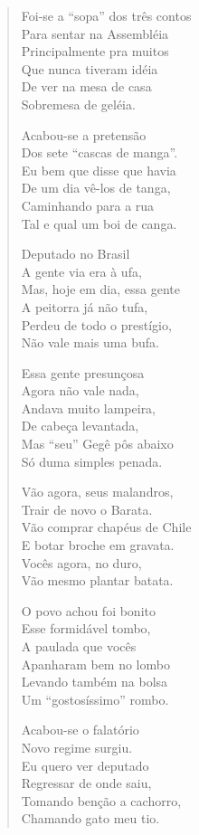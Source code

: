 \begin{verse}
Foi-se a “sopa” dos três contos\\
Para sentar na Assembléia\\
Principalmente pra muitos\\
Que nunca tiveram idéia\\
De ver na mesa de casa\\
Sobremesa de geléia.

Acabou-se a pretensão\\
Dos sete “cascas de manga”.\\
Eu bem que disse que havia\\
De um dia vê-los de tanga,\\
Caminhando para a rua\\
Tal e qual um boi de canga.
\pagebreak

Deputado no Brasil\\
A gente via era à ufa,\\
Mas, hoje em dia, essa gente\\
A peitorra já não tufa,\\
Perdeu de todo o prestígio,\\
Não vale mais uma bufa.

Essa gente presunçosa\\
Agora não vale nada,\\
Andava muito lampeira,\\
De cabeça levantada,\\
Mas “seu” Gegê pôs abaixo\\
Só duma simples penada.

Vão agora, seus malandros,\\
Trair de novo o Barata.\\
Vão comprar chapéus de Chile\\
E botar broche em gravata.\\
Vocês agora, no duro,\\
Vão mesmo plantar batata.

O povo achou foi bonito\\
Esse formidável tombo,\\
A paulada que vocês\\
Apanharam bem no lombo\\
Levando também na bolsa\\
Um “gostosíssimo” rombo.
\pagebreak

Acabou-se o falatório\\
Novo regime surgiu.\\
Eu quero ver deputado\\
Regressar de onde saiu,\\
Tomando benção a cachorro,\\
Chamando gato meu tio.


\end{verse}
